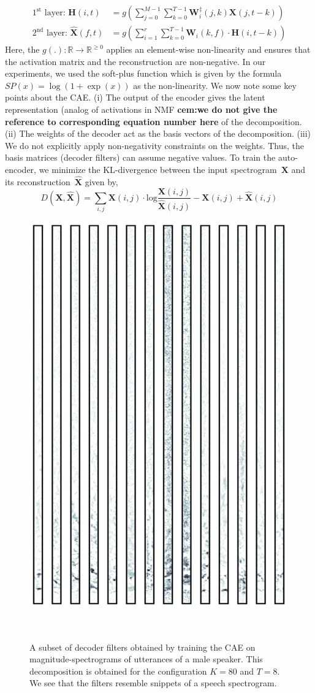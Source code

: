\documentclass{article}
\begin{document}
\begin{align}
    \text{$1^{\text{st}}$ layer:~}\mathbf{H}(i,t) &= g\left(\sum_{j=0}^{M-1} \sum_{k=0}^{T-1} \mathbf{W}_{i}^{\ddagger}(j,k)\mathbf{X}(j,t-k)\right) \\
    \text{$2^{\text{nd}}$ layer:~}\hat{\mathbf{X}}(f,t) &= g\left(\sum_{i=1}^{r} \sum_{k=0}^{T-1} \mathbf{W}_{i}(k,f)\cdot\mathbf{H}(i,t-k)\right)
    \label{eq:nmfcnncnn}
\end{align}
Here, the $g(.):\mathbb{R}\rightarrow \mathbb{R}^{\geq0}$ applies an element-wise non-linearity and ensures that the activation matrix and the reconstruction are non-negative. In our experiments, we used the soft-plus function which is given by the formula $SP(x) = \log(1+\exp(x))$ as the non-linearity. We now note some key points about the CAE. (i) The output of the encoder gives the latent representation (analog of activations in NMF \textbf{cem:we do not give the reference to corresponding equation number here} of the decomposition. (ii) The weights of the decoder act as the basis vectors of the decomposition. (iii) We do not explicitly apply non-negativity constraints on the weights. Thus, the basis matrices (decoder filters) can assume negative values. To train the auto-encoder, we minimize the KL-divergence between the input spectrogram~$\mathbf{X}$ and its reconstruction~$\hat{\mathbf{X}}$ given by,
\begin{equation*}
    D\left(\mathbf{X},\hat{\mathbf{X}}\right) = \sum_{i,j} \mathbf{X}(i,j)\cdot \text{log}\frac{\mathbf{X}(i,j)}{\hat{\mathbf{X}}(i,j)} - \mathbf{X}(i,j) + \hat{\mathbf{X}}(i,j)
\end{equation*}

\begin{figure}[ht!]
\centering
  \includegraphics[clip, trim = 0cm 0cm 0cm 0cm, width=\columnwidth, height = 0.8\columnwidth]{Figs/Bases.png}
  \caption{A subset of decoder filters obtained by training the CAE on magnitude-spectrograms of utterances of a male speaker. This decomposition is obtained for the configuration $K = 80$ and $T = 8$. We see that the filters resemble snippets of a speech spectrogram.}~\label{fig:cnn_demo_speech}
\end{figure}
\end{document}
